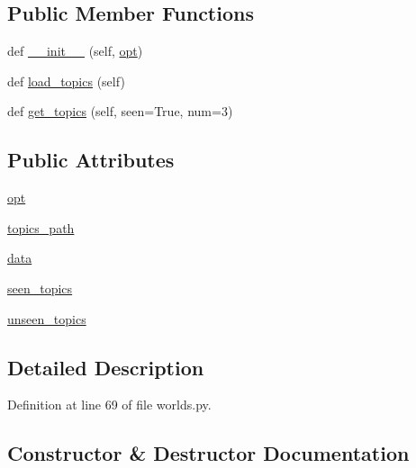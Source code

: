 \subsection*{Public Member Functions}
\begin{DoxyCompactItemize}
\item 
def \hyperlink{classmturk__evaluation__task_1_1worlds_1_1TopicsGenerator_a3cb3eed92ce80e71f7664668cd6306c7}{\+\_\+\+\_\+init\+\_\+\+\_\+} (self, \hyperlink{classmturk__evaluation__task_1_1worlds_1_1TopicsGenerator_a848e6f5213a71110d78b305b5fa51f17}{opt})
\item 
def \hyperlink{classmturk__evaluation__task_1_1worlds_1_1TopicsGenerator_a86b2c48833252eb7d3a2d432c8d7bb82}{load\+\_\+topics} (self)
\item 
def \hyperlink{classmturk__evaluation__task_1_1worlds_1_1TopicsGenerator_a15079ca215356b506ead5a1aa34f54eb}{get\+\_\+topics} (self, seen=True, num=3)
\end{DoxyCompactItemize}
\subsection*{Public Attributes}
\begin{DoxyCompactItemize}
\item 
\hyperlink{classmturk__evaluation__task_1_1worlds_1_1TopicsGenerator_a848e6f5213a71110d78b305b5fa51f17}{opt}
\item 
\hyperlink{classmturk__evaluation__task_1_1worlds_1_1TopicsGenerator_a18ceb76f229980eee37d92efde0b144a}{topics\+\_\+path}
\item 
\hyperlink{classmturk__evaluation__task_1_1worlds_1_1TopicsGenerator_af10dcab45654f6882a1eae229d19c9c4}{data}
\item 
\hyperlink{classmturk__evaluation__task_1_1worlds_1_1TopicsGenerator_a711ff20c51d0676bece32cd2aac16e4b}{seen\+\_\+topics}
\item 
\hyperlink{classmturk__evaluation__task_1_1worlds_1_1TopicsGenerator_a92d0396be90268f146d4a8c08f2fefe9}{unseen\+\_\+topics}
\end{DoxyCompactItemize}


\subsection{Detailed Description}


Definition at line 69 of file worlds.\+py.



\subsection{Constructor \& Destructor Documentation}
\mbox{\label{classmturk__evaluation__task_1_1worlds_1_1TopicsGenerator_a3cb3eed92ce80e71f7664668cd6306c7}} 
